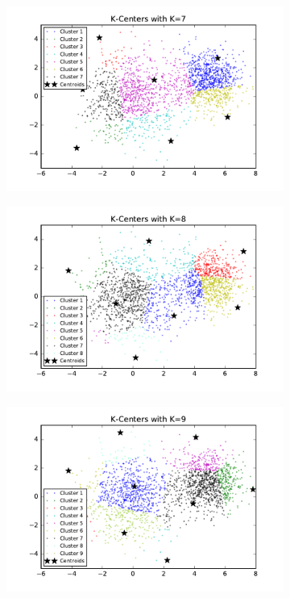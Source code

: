 \begin{figure}[htb]
\begin{subfigure}[b]{0.475\textwidth}
            \includegraphics[width=\textwidth]{./figures/clustering_kCenter_7.pdf}
        \end{subfigure}
        \hfill
        \begin{subfigure}[b]{0.475\textwidth}  
            \centering 
            \includegraphics[width=\textwidth]{./figures/clustering_kCenter_8.pdf}
        \end{subfigure}
        \begin{subfigure}[b]{0.475\textwidth}   
            \centering 
            \includegraphics[width=\textwidth]{./figures/clustering_kCenter_9.pdf}

\end{subfigure}
\end{figure}
